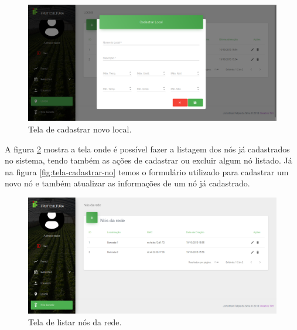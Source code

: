 \begin{figure}[H]
    \centering
    \includegraphics[scale=0.3]{04-figuras/tela_cadastra_local.png}
    \caption{Tela de cadastrar novo local.}
    \vspace{-\baselineskip}
    \label{fig:tela-cadastrar-local}
\end{figure}

A figura \ref{fig:tela-listar-nos} mostra a tela onde é possível fazer a listagem dos nós já cadastrados no sistema, tendo também as ações de cadastrar ou excluir algum nó listado. Já na figura \ref{fig:tela-cadastrar-no} temos o formulário utilizado para cadastrar um novo nó e também atualizar as informações de um nó já cadastrado.

\begin{figure}[H]
    \centering
    \includegraphics[scale=0.3]{04-figuras/tela_lista_no.png}
    \caption{Tela de listar nós da rede.}
    \vspace{-\baselineskip}
    \label{fig:tela-listar-nos}
\end{figure}

